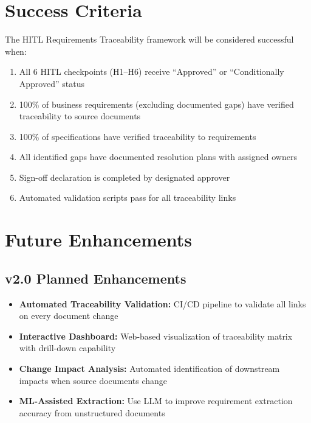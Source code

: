 \section{Success Criteria}
\label{sec:success-criteria}

The HITL Requirements Traceability framework will be considered
successful when:

\begin{enumerate}
  \item All 6 HITL checkpoints (H1--H6) receive ``Approved'' or
        ``Conditionally Approved'' status
  \item 100\% of business requirements (excluding documented gaps)
        have verified traceability to source documents
  \item 100\% of specifications have verified traceability to requirements
  \item All identified gaps have documented resolution plans with
        assigned owners
  \item Sign-off declaration is completed by designated approver
  \item Automated validation scripts pass for all traceability links
\end{enumerate}

\section{Future Enhancements}
\label{sec:future-enhancements}

\subsection{v2.0 Planned Enhancements}

\begin{itemize}[noitemsep]
  \item \textbf{Automated Traceability Validation:} CI/CD pipeline to
        validate all links on every document change
  \item \textbf{Interactive Dashboard:} Web-based visualization of
        traceability matrix with drill-down capability
  \item \textbf{Change Impact Analysis:} Automated identification of
        downstream impacts when source documents change
  \item \textbf{ML-Assisted Extraction:} Use LLM to improve requirement
        extraction accuracy from unstructured documents
\end{itemize}

